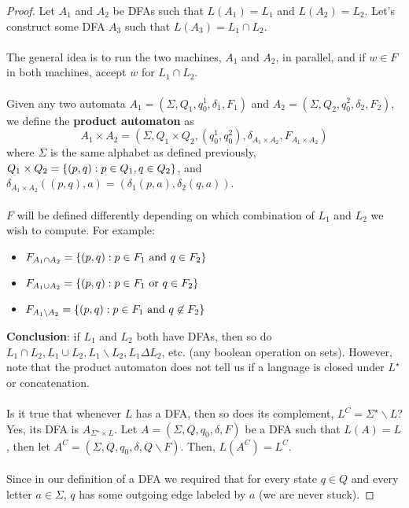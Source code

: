 \documentclass[]{article}
\DeclarePairedDelimiter{\set}{\lbrace}{\rbrace}
\theoremstyle{definition}
\begin{document}
        \begin{proof}
          Let $A_1$ and $A_2$ be DFAs such that $L(A_1) = L_1$ and $L(A_2) = L_2$. Let's construct some DFA $A_3$ such that $L(A_3) = L_1 \cap L_2$.
          \\ \\
          The general idea is to run the two machines, $A_1$ and $A_2$, in parallel, and if $w \in F$ in both machines, accept $w$ for $L_1 \cap L_2$.
          \\ \\
          Given any two automata $A_1 = (\Sigma, Q_1, q_0^1, \delta_1, F_1)$ and $A_2 = (\Sigma, Q_2, q_0^2, \delta_2, F_2)$, we define the \textbf{product automaton} as
          $$
            A_1 \times A_2 = (\Sigma, Q_1 \times Q_2, (q_0^1, q_0^2), \delta_{A_1 \times A_2}, F_{A_1 \times A_2})
          $$
          where $\Sigma$ is the same alphabet as defined previously, $Q_1 \times Q_2 = \set{ (p, q) : p \in Q_1, q \in Q_2 }$, and $\delta_{A_1 \times A_2}((p, q), a) = (\delta_1(p, a), \delta_2(q, a))$.
          \\ \\
          $F$ will be defined differently depending on which combination of $L_1$ and $L_2$ we wish to compute. For example:
          \begin{itemize}
            \item $F_{A_1 \cap A_2} = \set{ (p, q) : p \in F_1 \text{ and } q \in F_2 }$
            \item $F_{A_1 \cup A_2} = \set{ (p, q) : p \in F_1 \text{ or } q \in F_2 }$
            \item $F_{A_1 \backslash A_2} = \set{ (p, q) : p \in F_1 \text{ and } q \not \in F_2 }$
          \end{itemize}

          \textbf{Conclusion}: if $L_1$ and $L_2$ both have DFAs, then so do $L_1 \cap L_2, L_1 \cup L_2, L_1 \backslash L_2, L_1 \Delta L_2$, etc. (any boolean operation on sets). However, note that the product automaton does not tell us if a language is closed under $L^\star$ or concatenation.
          \\ \\
          Is it true that whenever $L$ has a DFA, then so does its complement, $L^C = \Sigma^\star \backslash L$? Yes, its DFA is $A_{\Sigma^\star \times L}$. Let $A = (\Sigma, Q, q_0, \delta, F)$ be a DFA such that $L(A) = L$, then let $A^C = (\Sigma, Q, q_0, \delta, Q \backslash F)$. Then, $L(A^C) = L^C$.
          \\ \\
          Since in our definition of a DFA we required that for every state $q \in Q$ and every letter $a \in \Sigma$, $q$ has some outgoing edge labeled by $a$ (we are never stuck).
        \end{proof}
\end{document}
